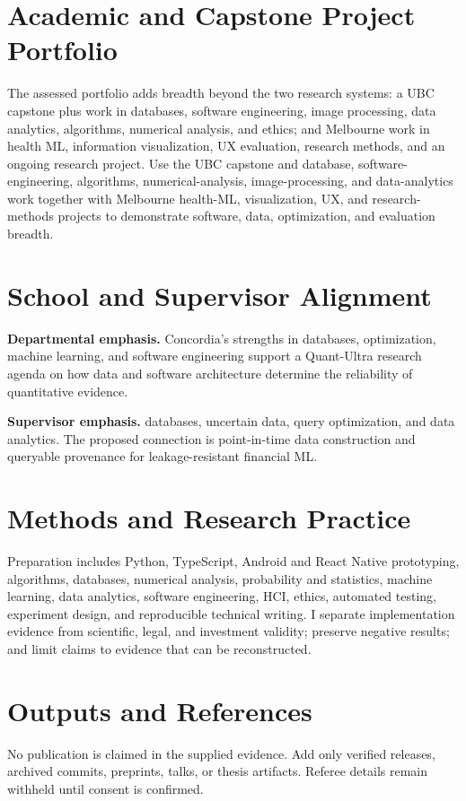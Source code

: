 \documentclass[11pt]{article}
\begin{document}
\section*{Academic and Capstone Project Portfolio}
The assessed portfolio adds breadth beyond the two research systems: a UBC capstone plus work in databases, software engineering, image processing, data analytics, algorithms, numerical analysis, and ethics; and Melbourne work in health ML, information visualization, UX evaluation, research methods, and an ongoing research project. Use the UBC capstone and database, software-engineering, algorithms, numerical-analysis, image-processing, and data-analytics work together with Melbourne health-ML, visualization, UX, and research-methods projects to demonstrate software, data, optimization, and evaluation breadth.

\section*{School and Supervisor Alignment}
\textbf{Departmental emphasis.} Concordia's strengths in databases, optimization, machine learning, and software engineering support a Quant-Ultra research agenda on how data and software architecture determine the reliability of quantitative evidence.

\textbf{Supervisor emphasis.} databases, uncertain data, query optimization, and data analytics. The proposed connection is point-in-time data construction and queryable provenance for leakage-resistant financial ML.

\section*{Methods and Research Practice}
Preparation includes Python, TypeScript, Android and React Native prototyping, algorithms, databases, numerical analysis, probability and statistics, machine learning, data analytics, software engineering, HCI, ethics, automated testing, experiment design, and reproducible technical writing. I separate implementation evidence from scientific, legal, and investment validity; preserve negative results; and limit claims to evidence that can be reconstructed.

\section*{Outputs and References}
No publication is claimed in the supplied evidence. Add only verified releases, archived commits, preprints, talks, or thesis artifacts. Referee details remain withheld until consent is confirmed.
\end{document}
